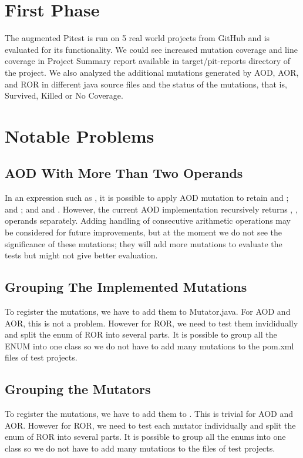 \section{First Phase}





The augmented Pitest is run on 5 real world projects from GitHub and is evaluated for its functionality.
We could see increased mutation coverage and line coverage in Project Summary report available in target/pit-reports directory of the project.
We also analyzed the additional mutations generated by AOD, AOR, and ROR in different java source files and the status of the mutations, that is, Survived, Killed or No Coverage.

\section{Notable Problems}
\subsection{AOD With More Than Two Operands}
In an expression such as , it is possible to apply AOD mutation to retain  and ;  and ; and  and .
However, the current AOD implementation recursively returns , ,  operands separately.
Adding handling of consecutive arithmetic operations may be considered for future improvements, but at the moment we do not see the significance of these mutations;
they will add more mutations to evaluate the tests but might not give better evaluation.

\subsection{Grouping The Implemented Mutations}
To register the mutations, we have to add them to Mutator.java. For AOD and AOR, this is not a problem. However for ROR, we need to test them invididually and split the enum of ROR into several parts. It is possible to group all the ENUM into one class so we do not have to add many mutations to the pom.xml files of test projects.

\subsection{Grouping the Mutators}
To register the mutations, we have to add them to .
This is trivial for AOD and AOR.
However for ROR, we need to test each mutator individually and split the enum of ROR into several parts.
It is possible to group all the enums into one class so we do not have to add many mutations to the  files of test projects.

